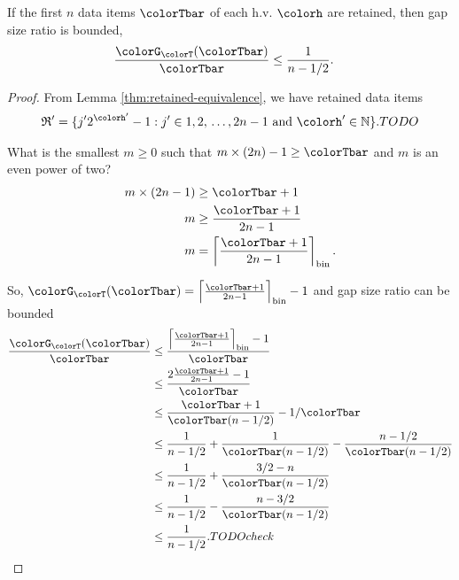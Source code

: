 \begin{lemma}
\label{thm:gap-size-ratio-stretched}
If the first $n$ data items $\colorTbar$ of each h.v. $\colorh$ are retained, then gap size ratio is bounded,
\begin{align*}
\frac{\colorG_{\colorT}(\colorTbar)}{\colorTbar}
&\leq
\frac{1}{n - 1/2}.
\end{align*}
\end{lemma}
\begin{proof}

From Lemma \ref{thm:retained-equivalence}, we have retained data items
\begin{align*}
\mathfrak{R}' =
\{
  j'2^{\colorh'} - 1
  :
  j' \in 1,2,\,\ldots,2n - 1
  \text{ and }
  \colorh' \in \mathbb{N}
\}. TODO
\end{align*}


What is the smallest $m \geq 0$ such that $m \times (2n) - 1 \geq \colorTbar$ and $m$ is an even power of two?
\begin{align*}
m \times (2n - 1)
&\geq \colorTbar + 1\\
m
&\geq \frac{\colorTbar + 1}{2n - 1}\\
m
&= \left\lceil \frac{\colorTbar + 1 }{2n - 1} \right\rceil_{\mathrm{bin}}.
\end{align*}

So, $\colorG_{\colorT}(\colorTbar) = \left\lceil \frac{\colorTbar + 1 }{2n - 1} \right\rceil_{\mathrm{bin}} - 1$ and gap size ratio can be bounded
\begin{align*}
\frac{\colorG_{\colorT}(\colorTbar)}{\colorTbar}
&\leq
\frac{
\left\lceil \frac{\colorTbar + 1 }{2n - 1} \right\rceil_{\mathrm{bin}} - 1
}{
\colorTbar
}\\
&\leq
\frac{
2\frac{\colorTbar + 1}{2n - 1} - 1
}{
\colorTbar
}\\
&\leq
\frac{\colorTbar + 1}{\colorTbar(n - 1/2)} - 1/\colorTbar\\
&\leq
\frac{1}{n - 1/2} + \frac{1}{\colorTbar(n - 1/2)} - \frac{n - 1/2}{\colorTbar(n - 1/2)}\\
&\leq
\frac{1}{n - 1/2} + \frac{3/2 - n}{\colorTbar(n - 1/2)}\\
&\leq
\frac{1}{n - 1/2} - \frac{n - 3/2}{\colorTbar(n - 1/2)}\\
&\leq
\frac{1}{n - 1/2}. TODO check
\end{align*}

\end{proof}
